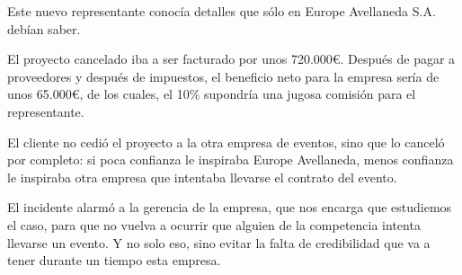 \documentclass[a4paper]{article}
\begin{document}
Este nuevo representante conocía detalles que sólo en Europe Avellaneda S.A. debían saber.

El proyecto cancelado iba a ser facturado por unos 720.000€. Después de pagar a proveedores y después de impuestos, el beneficio neto para la empresa sería de unos 65.000€, de los cuales, el 10\% supondría una jugosa comisión para el representante.

El cliente no cedió el proyecto a la otra empresa de eventos, sino que lo canceló por completo: si poca confianza le inspiraba Europe Avellaneda, menos confianza le inspiraba otra empresa que intentaba llevarse el contrato del evento.

El incidente alarmó a la gerencia de la empresa, que nos encarga que estudiemos el caso, para que no vuelva a ocurrir que alguien de la competencia intenta llevarse un evento. Y no solo eso, sino evitar la falta de credibilidad que va a tener durante un tiempo esta empresa.
\end{document}
